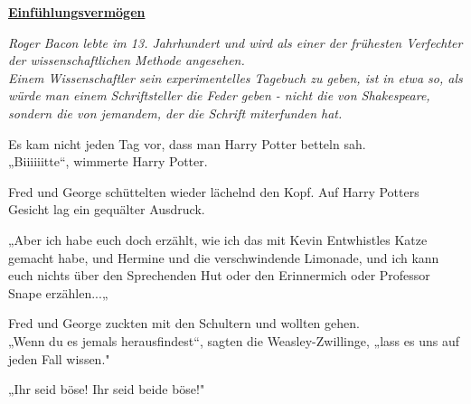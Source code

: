 

\hypertarget{einfuxfchlungsvermuxf6gen}{%

\textbf{\uline{Einfühlungsvermögen}}

\hfill\break \emph{Roger Bacon lebte im 13. Jahrhundert und wird als einer der frühesten Verfechter der wissenschaftlichen Methode angesehen.\\ Einem Wissenschaftler sein experimentelles Tagebuch zu geben, ist in etwa so, als würde man einem Schriftsteller die Feder geben - nicht die von Shakespeare, sondern die von jemandem, der die Schrift miterfunden hat.}

Es kam nicht jeden Tag vor, dass man Harry Potter betteln sah.\\ „Biiiiiitte“, wimmerte Harry Potter.

Fred und George schüttelten wieder lächelnd den Kopf. Auf Harry Potters Gesicht lag ein gequälter Ausdruck.

„Aber ich habe euch doch erzählt, wie ich das mit Kevin Entwhistles Katze gemacht habe, und Hermine und die verschwindende Limonade, und ich kann euch nichts über den Sprechenden Hut oder den Erinnermich oder Professor Snape erzählen...„

Fred und George zuckten mit den Schultern und wollten gehen.\\ „Wenn du es jemals herausfindest“, sagten die Weasley-Zwillinge, „lass es uns auf jeden Fall wissen."

„Ihr seid böse! Ihr seid beide böse!"

}
